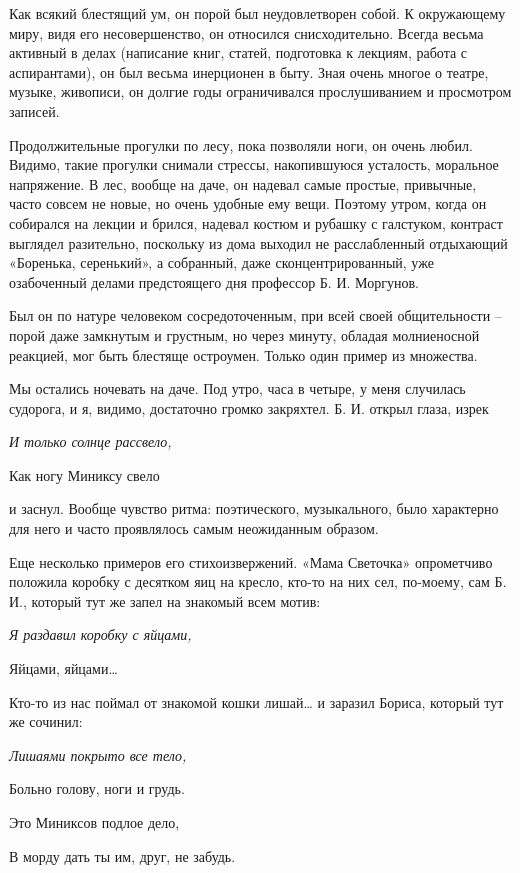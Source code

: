 	Как всякий блестящий ум, он порой был неудовлетворен собой. К окружающему миру, видя его несовершенство, он относился снисходительно. Всегда весьма активный в делах (написание книг, статей, подготовка к лекциям, работа с аспирантами), он был весьма инерционен в быту. Зная очень многое о театре, музыке, живописи, он долгие годы ограничивался прослушиванием и просмотром записей. 
	
	Продолжительные прогулки по лесу, пока позволяли ноги, он очень любил. Видимо, такие прогулки снимали стрессы, накопившуюся усталость, моральное напряжение. В лес, вообще на даче, он надевал самые простые, привычные, часто совсем не новые, но очень удобные ему вещи. Поэтому утром, когда он собирался на лекции и брился, надевал костюм и рубашку с галстуком, контраст выглядел разительно, поскольку из дома выходил не расслабленный отдыхающий «Боренька, серенький», а собранный, даже сконцентрированный, уже озабоченный делами предстоящего дня профессор Б. И. Моргунов.
	
	Был он по натуре человеком сосредоточенным, при всей своей общительности – порой даже замкнутым и грустным, но через минуту, обладая молниеносной реакцией, мог быть блестяще остроумен. Только один пример из множества.
	
	Мы остались ночевать на даче. Под утро, часа в четыре, у меня случилась судорога, и я, видимо, достаточно громко закряхтел. Б. И. открыл глаза, изрек

\indent

{\itshape
		И только солнце рассвело,
		
		Как ногу Миниксу свело
}

\indent

и заснул. Вообще чувство ритма: поэтического, музыкального, было характерно для него и часто проявлялось самым неожиданным образом.

	Еще несколько примеров его стихоизвержений. «Мама Светочка» опрометчиво положила коробку с десятком яиц на кресло, кто-то на них сел, по-моему, сам Б. И., который тут же запел на знакомый всем мотив: 

\indent

{\itshape
		Я раздавил коробку с яйцами,
		
		Яйцами, яйцами…
}

\indent

Кто-то из нас поймал от знакомой кошки лишай… и заразил Бориса, который тут же сочинил:

\indent

{\itshape	
		Лишаями покрыто все тело,
		
		Больно голову, ноги и грудь.
		
		Это Миниксов подлое дело,
		
		В морду дать ты им, друг, не забудь.
}

